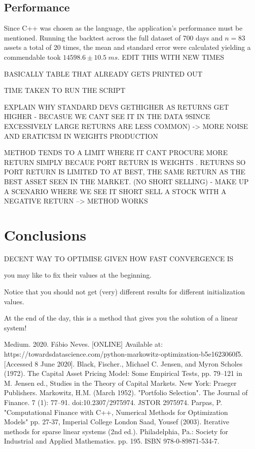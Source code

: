 \documentclass{article}
\begin{document}
\subsection{Performance}

Since C++ was chosen as the language, the application's performance must be mentioned. Running the backtest across the full dataset of 700 days and $n=83$ assets a total of 20 times, the mean and standard error were calculated yielding a commendable took $14598.6 \pm 10.5\;ms$. EDIT THIS WITH NEW TIMES






BASICALLY TABLE THAT ALREADY GETS PRINTED OUT

TIME TAKEN TO RUN THE SCRIPT

EXPLAIN WHY STANDARD DEVS GETHIGHER AS RETURNS GET HIGHER - BECASUE WE CANT SEE IT IN THE DATA 9SINCE EXCESSIVELY LARGE RETURNS ARE LESS COMMON) -> MORE NOISE AND ERATICISM IN WEIGHTS PRODUCTION 

METHOD TENDS TO A LIMIT WHERE IT CANT PROCURE MORE RETURN SIMPLY BECAUE PORT RETURN IS WEIGHTS . RETURNS SO PORT RETURN IS LIMITED TO AT BEST, THE SAME RETURN AS THE BEST ASSET SEEN IN THE MARKET. (NO SHORT SELLING) - MAKE UP A SCENARIO WHERE WE SEE IT SHORT SELL A STOCK WITH A NEGATIVE RETURN --> METHOD WORKS


\section{Conclusions}
\label{sec:concs}


DECENT WAY TO OPTIMISE GIVEN HOW FAST CONVERGENCE IS


you may like to fix their values at the beginning.

Notice that you should not get (very) different results for different initialization values.

At the end of the day, this is a method that gives you the solution of a linear system!




\begin{thebibliography}{}
\label{sec:thebibliography}
	 Medium. 2020. Fábio Neves. [ONLINE] Available at: https://towardsdatascience.com/python-markowitz-optimization-b5e1623060f5. [Accessed 8 June 2020].
	 Black, Fischer., Michael C. Jensen, and Myron Scholes (1972). The Capital Asset Pricing Model: Some Empirical Tests, pp. 79–121 in M. Jensen ed., Studies in the Theory of Capital Markets. New York: Praeger Publishers.
	 Markowitz, H.M. (March 1952). "Portfolio Selection". The Journal of Finance. 7 (1): 77–91. doi:10.2307/2975974. JSTOR 2975974.
	 Parpas, P. "Computational Finance with C++, Numerical Methods for Optimization Models" pp. 27-37, Imperial College London
	 Saad, Yousef (2003). Iterative methods for sparse linear systems (2nd ed.). Philadelphia, Pa.: Society for Industrial and Applied Mathematics. pp. 195. ISBN 978-0-89871-534-7.
	
	
	
\end{thebibliography} 
\end{document}
